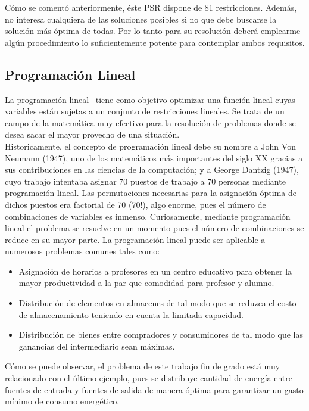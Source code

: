 Cómo se comentó anteriormente, éste PSR dispone de 81 restricciones. Además, no interesa cualquiera de las soluciones posibles si no que debe buscarse la solución más óptima de todas. Por lo tanto para su resolución deberá emplearme algún procedimiento lo suficientemente potente para contemplar ambos requisitos.
\subsection{Programación Lineal}
La programación lineal~\cite{Loom64} tiene como objetivo optimizar una función lineal cuyas variables están sujetas a un conjunto de restricciones lineales.
Se trata de un campo de la matemática muy efectivo para la resolución de problemas donde se desea sacar el mayor provecho de una situación.\\

Historicamente, el concepto de programación lineal debe su nombre a John Von Neumann (1947), uno de los matemáticos más importantes del siglo XX gracias a sus contribuciones en las ciencias de la computación; y a George Dantzig (1947), cuyo trabajo intentaba asignar 70 puestos de trabajo a 70 personas mediante programación lineal. Las permutaciones necesarias para la asignación óptima de dichos puestos era factorial de 70 (70!), algo enorme, pues el número de combinaciones de variables es inmenso. Curiosamente, mediante programación lineal el problema se resuelve en un momento pues el número de combinaciones se reduce en su mayor parte. La programación lineal puede ser aplicable a numerosos problemas comunes tales como:
\begin{itemize}
\item Asignación de horarios a profesores en un centro educativo para obtener la mayor productividad a la par que comodidad para profesor y alumno.
\item Distribución de elementos en almacenes de tal modo que se reduzca el costo de almacenamiento teniendo en cuenta la limitada capacidad.
\item Distribución de bienes entre compradores y consumidores de tal modo que las ganancias del intermediario sean máximas.
\end{itemize}
Cómo se puede observar, el problema de este trabajo fin de grado está muy relacionado con el último ejemplo, pues se distribuye cantidad de energía entre fuentes de entrada y fuentes de salida de manera óptima para garantizar un gasto mínimo de consumo energético.\\

